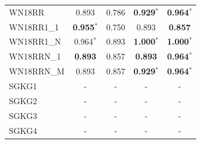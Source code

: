 \begin{table}[t]
{\begin{tabular}{l||cc||cc}
\hline
WN18RR & 0.893 & 0.786 & \textbf{0.929}$^*$ & \textbf{0.964}$^*$ \\
WN18RR1\_1 & \textbf{0.955}$^*$ & 0.750 & 0.893 & \textbf{0.857} \\
WN18RR1\_N & 0.964$^*$ & 0.893 & \textbf{1.000}$^*$ & \textbf{1.000}$^*$ \\
WN18RRN\_1 & \textbf{0.893} & 0.857 & \textbf{0.893} & \textbf{0.964}$^*$ \\
WN18RRN\_M & 0.893 & 0.857 & \textbf{0.929}$^*$ & \textbf{0.964}$^*$ \\
\hline
SGKG1 & - & - & - & - \\
SGKG2 & - & - & - & - \\
SGKG3 & - & - & - & - \\
SGKG4 & - & - & - & - \\
\hline
\end{tabular}%
}
\end{table}
